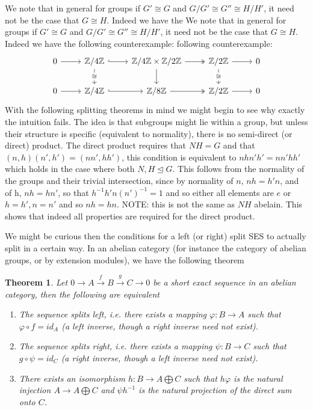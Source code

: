 \documentclass{report}
\newtheorem{theorem}{Theorem}
\begin{document}
\begin{singlespace}
\begin{enumerate}
  
  We note that in general for groups if $G'\cong G$ and $G/G'\cong G''\cong H/H'$, it need not be the case that $G\cong H$. Indeed we have the   We note that in general for groups if $G'\cong G$ and $G/G'\cong G''\cong H/H'$, it need not be the case that $G\cong H$. Indeed we have the following counterexample:
following counterexample:
   \[\begin{tikzcd}
	0 & {\mathbb{Z}/4\mathbb{Z}} & {\mathbb{Z}/4\mathbb{Z}\times \mathbb{Z}/2\mathbb{Z}} & {\mathbb{Z}/2\mathbb{Z}} & 0 \\
	0 & {\mathbb{Z}/4\mathbb{Z}} & {\mathbb{Z}/8\mathbb{Z}} & {\mathbb{Z}/2\mathbb{Z}} & 0
	\arrow[hook, from=1-2, to=1-3]
	\arrow[two heads, from=1-3, to=1-4]
	\arrow[from=1-1, to=1-2]
	\arrow[from=1-4, to=1-5]
	\arrow[from=2-1, to=2-2]
	\arrow[from=2-4, to=2-5]
	\arrow[hook, from=2-2, to=2-3]
	\arrow[two heads, from=2-3, to=2-4]
	\arrow["\cong"{description}, from=1-4, to=2-4]
	\arrow["\cong"{description}, from=1-2, to=2-2]
	\arrow[from=1-3, to=2-3]
      \end{tikzcd}\]
      With the following splitting theorems in mind we might begin to see why exactly the intuition fails. The idea is that subgroups might lie within a group, but unless their structure is specific (equivalent to normality), there is no semi-direct (or direct) product. The direct product requires that $NH=G$ and that $(n,h)(n',h')=(nn',hh')$, this condition is equivalent to $nhn'h'=nn'hh'$ which holds in the case where both $N,H\trianglelefteq G$. This follows from the normality of the groups and their trivial intersection, since by normality of $n$, $nh=h'n$, and of h, $nh=hn'$, so that $h^{-1}h'n(n')^{-1}=1$ and so either all elements are $e$ or $h=h', n=n'$ and so $nh=hn$. NOTE: this is not the same as $NH$ abelain. This shows that indeed all properties are required for the direct product.
      
    We might be curious then the conditions for a left (or right) split SES to actually split in a certain way. In an abelian category (for instance the category of abelian groups, or by extension modules), we have the following theorem
    \begin{theorem}
      Let $0\to A\xrightarrow{f} B\xrightarrow{g} C\to 0$ be a short exact sequence in an abelian category, then the following are equivalent
      \begin{enumerate}
       \item The sequence splits left, i.e. there exists a mapping  $\varphi:B\to A$ such that $\varphi\circ f=id_A$ (a left inverse, though a right inverse need not exist).
       \item The sequence splits right, i.e. there exists a mapping $\psi:B\to C$ such that $g\circ \psi=id_C$ (a right inverse, though a left inverse need not exist).
       \item There exists an isomorphism $h:B\to A\bigoplus C$ such that $h\varphi$ is the natural injection $A\to A\bigoplus C$ and $\psi h^{-1}$ is the natural projection of the direct sum onto $C$.
      \end{enumerate}
    \end{theorem}
     

\end{enumerate}
\end{singlespace}
\end{document}
